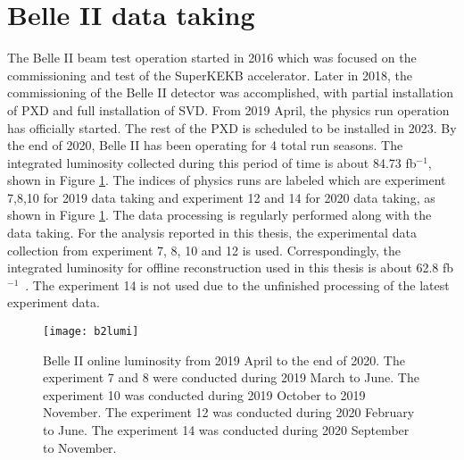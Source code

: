 \section{Belle II data taking}
The Belle II beam test operation started in 2016 which was focused on the commissioning and test of the SuperKEKB accelerator. Later in 2018, the commissioning of the Belle II detector was accomplished, with partial installation of PXD and full installation of SVD. From 2019 April, the physics run operation has officially started. The rest of the PXD is scheduled to be installed in 2023. By the end of 2020, Belle II has been operating for 4 total run seasons. The integrated luminosity collected during this period of time is about 84.73 fb$^{-1}$, shown in Figure \ref{fig:b2lumi}. The indices of physics runs are labeled which are experiment 7,8,10 for 2019 data taking and experiment 12 and 14 for 2020 data taking, as shown in Figure \ref{fig:b2lumi}. The data processing is regularly performed along with the data taking. For the analysis reported in this thesis, the experimental data collection from experiment 7, 8, 10 and 12 is used. Correspondingly, the integrated luminosity for offline reconstruction used in this thesis is about 62.8 fb$^{-1}$~\cite{b2onlinelumi}. The experiment 14 is not used due to the unfinished processing of the latest experiment data. 

\begin{figure}
	\centering
	\texttt{[image: b2lumi]}
	\caption{Belle II online luminosity from 2019 April to the end of 2020. The experiment 7 and 8 were conducted during 2019 March to June. The experiment 10 was conducted during 2019 October to 2019 November. The experiment 12 was conducted during 2020 February to June. The experiment 14 was conducted during 2020 September to November.}
	\label{fig:b2lumi} 
\end{figure}
